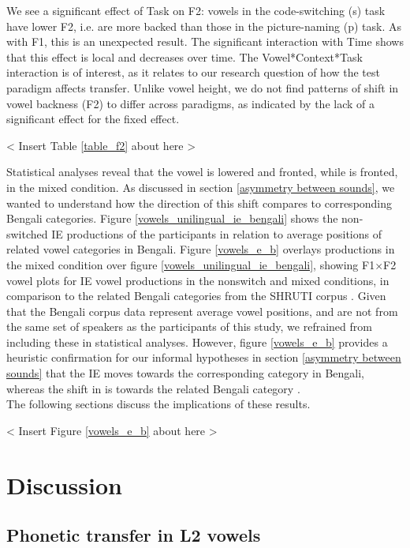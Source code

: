 \documentclass[12 pt]{article}
\newcommand{\nt}[1]{\textipa{[#1]}} %
\begin{document}
We see a significant effect of Task on F2: vowels in the code-switching (s) task have lower F2, i.e. are more backed than those in the picture-naming (p) task. As with F1, this is an unexpected result. The significant interaction with Time shows that this effect is local and decreases over time. The Vowel*Context*Task interaction is of interest, as it relates to our research question of how the test paradigm affects transfer. Unlike vowel height, we do not find patterns of shift in vowel backness (F2) to differ across paradigms, as indicated by the lack of a significant effect for the fixed effect. 

< Insert Table \ref{table_f2} about here >

\vspace{3cm}

Statistical analyses reveal that the vowel \nt{2} is lowered and fronted, while \nt{\ae} is fronted, in the mixed condition. As discussed in section \ref{asymmetry between sounds}, we wanted to understand how the direction of this shift compares to corresponding Bengali categories. Figure \ref{vowels_unilingual_ie_bengali} shows the non-switched IE productions of the participants in relation to average positions of related vowel categories in Bengali. Figure \ref{vowels_e_b} overlays productions in the mixed condition over figure \ref{vowels_unilingual_ie_bengali}, showing F1$\times$F2 vowel plots for IE vowel productions in the nonswitch and mixed conditions, in comparison to the related Bengali categories from the SHRUTI corpus \citep{shruticorpus}. Given that the Bengali corpus data represent average vowel positions, and are not from the same set of speakers as the participants of this study, we refrained from including these in statistical analyses. However, figure \ref{vowels_e_b} provides a heuristic confirmation for our informal hypotheses in section \ref{asymmetry between sounds} that the IE \nt{\ae} moves towards the corresponding \nt{\ae} category in Bengali, whereas the shift in \nt{2} is towards the related Bengali category \nt{a:}.\\
The following sections discuss the implications of these results.

< Insert Figure \ref{vowels_e_b} about here >

\section{Discussion}


\subsection{Phonetic transfer in L2 vowels}
\end{document}
